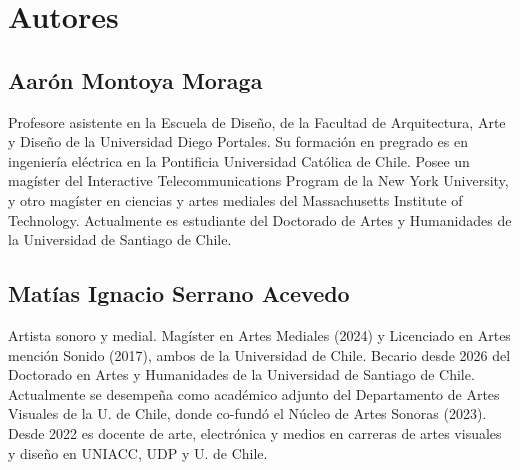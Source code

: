 \documentclass[../principal.tex]{subfiles}
\begin{document}

\chapter{Autores}

\section{Aarón Montoya Moraga}

Profesore asistente en la Escuela de Diseño, de la Facultad de Arquitectura, Arte y Diseño de la Universidad Diego Portales. Su formación en pregrado es en ingeniería eléctrica en la Pontificia Universidad Católica de Chile. Posee un magíster del Interactive Telecommunications Program de la New York University, y otro magíster en ciencias y artes mediales del Massachusetts Institute of Technology. Actualmente es estudiante del Doctorado de Artes y Humanidades de la Universidad de Santiago de Chile.

\section{Matías Ignacio Serrano Acevedo}

Artista sonoro y medial. Magíster en Artes Mediales (2024) y Licenciado en Artes mención Sonido (2017), ambos de la Universidad de Chile. Becario desde 2026 del Doctorado en Artes y Humanidades de la Universidad de Santiago de Chile. Actualmente se desempeña como académico adjunto del Departamento de Artes Visuales de la U. de Chile, donde co-fundó el Núcleo de Artes Sonoras (2023). Desde 2022 es docente de arte, electrónica y medios en carreras de artes visuales y diseño en UNIACC, UDP y U. de Chile. 

\newpage
\end{document}
